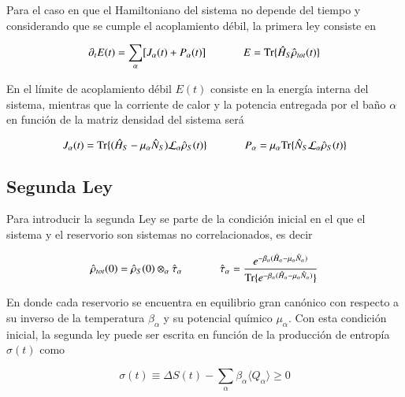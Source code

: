 Para el caso en que el Hamiltoniano del sistema no depende del tiempo y considerando que se cumple el acoplamiento débil, la primera ley consiste en

\begin{equation*}
    \partial_{t}E(t) = \sum_{\alpha}[J_{\alpha}(t) + P_{\alpha}(t) ] \hspace{12mm} E = \text{Tr}\{\hat{H}_{S}\hat{\rho}_{tot}(t) \}
\end{equation*}

En el límite de acoplamiento débil $E(t)$ consiste en la energía interna del sistema, mientras que la corriente de calor y la potencia entregada por el baño $\alpha$ en función de la matriz densidad del sistema será 

\begin{equation*}
    J_{\alpha}(t) = \text{Tr}\{(\hat{H}_{S} - \mu_{\alpha}\hat{N}_S)\mathcal{L}_{\alpha}\hat{\rho}_{S}(t) \} \hspace{12mm} P_{\alpha} = \mu_{\alpha} \text{Tr}\{\hat{N}_{S}\mathcal{L}_{\alpha}\hat{\rho}_{S}(t) \} 
\end{equation*}

\subsection{Segunda Ley}
Para introducir la segunda Ley se parte de la condición inicial en el que el sistema y el reservorio son sistemas no correlacionados, es decir 

\begin{equation*}
    \hat{\rho}_{tot}(0) = \hat{\rho}_{S}(0)\otimes_{\alpha}\hat{\tau}_{\alpha} \hspace{12mm} \hat{\tau}_{\alpha} = \frac{e^{-\beta_{\alpha}(\hat{H}_{\alpha}-\mu_{\alpha}\hat{N}_{\alpha}) }}{ \text{Tr}\{e^{-\beta_{\alpha}(\hat{H}_{\alpha} - \mu_{\alpha}\hat{N}_{\alpha})}\} }
\end{equation*}

En donde cada reservorio se encuentra en equilibrio gran canónico con respecto a su inverso de la temperatura $\beta_{\alpha}$ y su potencial químico $\mu_{\alpha}$. Con esta condición inicial, la segunda ley puede ser escrita en función de la producción de entropía $\sigma(t)$ como \cite{esposito2010entropy}

\begin{equation*}
    \sigma(t) \equiv \Delta S(t) - \sum_{\alpha}\beta_{\alpha}\langle Q_{\alpha}\rangle \geq 0
\end{equation*}

